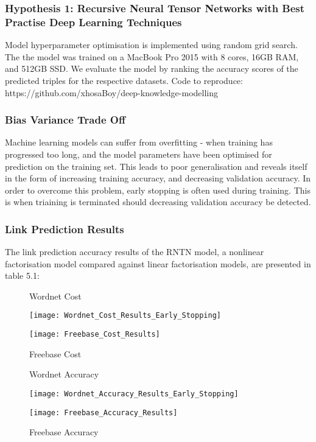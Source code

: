 
\subsubsection{Hypothesis 1: \newline 
Recursive Neural Tensor Networks with Best Practise Deep Learning Techniques}
Model hyperparameter optimisation is implemented using random grid search. The the model was trained on a MacBook Pro 2015 with 8 cores, 16GB RAM, and 512GB SSD. \newline
We evaluate the model by ranking the accuracy scores of the predicted triples for the respective datasets. Code to reproduce: https://github.com/xhosaBoy/deep-knowledge-modelling

\subsubsection{Bias Variance Trade Off}
Machine learning models can suffer from overfitting \cite{reference} - when training has progressed too long, and the model parameters have been optimised for prediction on the training set. This leads to poor generalisation  and reveals itself in the form of increasing training accuracy, and decreasing validation accuracy. In order to overcome this problem, early stopping is often used during training. This is when triaining is terminated should decreasing validation accuracy be detected.\newline

\subsubsection{Link Prediction Results}
The link prediction accuracy results of the RNTN model, a nonlinear factorisation model compared against linear factorisation models, are presented in table 5.1:

\begin{figure}[H]
	\parbox{.5\linewidth}{
   		\caption{Wordnet Cost}
   		\centering
    		\texttt{[image: Wordnet\_Cost\_Results\_Early\_Stopping]}
		}
	\hfill
	\parbox{.5\linewidth}{
		\caption{Freebase Cost}
   		\centering
		\texttt{[image: Freebase\_Cost\_Results]}
		}
\end{figure}


\begin{figure}[H]
	\parbox{.5\linewidth}{
   		\caption{Wordnet Accuracy}
   		\centering
    		\texttt{[image: Wordnet\_Accuracy\_Results\_Early\_Stopping]}
		}
	\hfill
	\parbox{.5\linewidth}{
		\caption{Freebase Accuracy}
   		\centering
		\texttt{[image: Freebase\_Accuracy\_Results]}
		}
\end{figure}



